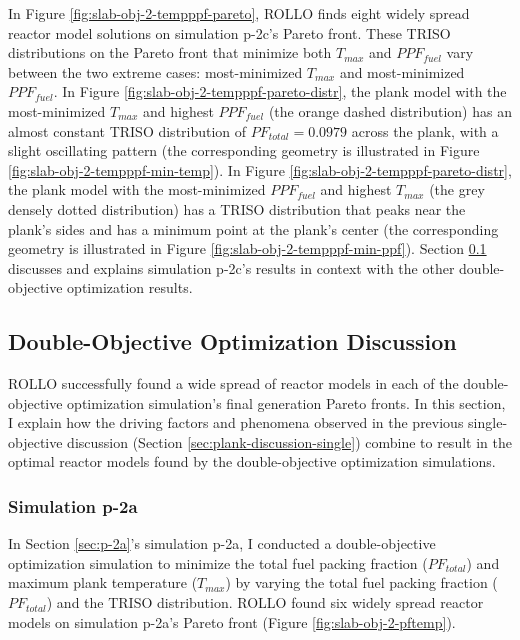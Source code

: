 In Figure \ref{fig:slab-obj-2-tempppf-pareto}, \gls{ROLLO} finds eight widely spread 
reactor model solutions on simulation p-2c's Pareto front. 
These \gls{TRISO} distributions on the Pareto front that minimize both $T_{max}$ 
and $PPF_{fuel}$ vary between the two extreme cases: 
most-minimized $T_{max}$ and most-minimized $PPF_{fuel}$.
In Figure \ref{fig:slab-obj-2-tempppf-pareto-distr}, the plank model with 
the most-minimized $T_{max}$ and highest $PPF_{fuel}$ (the orange dashed distribution) 
has an almost constant TRISO distribution of $PF_{total}=0.0979$ across the plank, 
with a slight oscillating pattern (the corresponding geometry is illustrated in Figure 
\ref{fig:slab-obj-2-tempppf-min-temp}).
In Figure \ref{fig:slab-obj-2-tempppf-pareto-distr}, the plank model with the
most-minimized $PPF_{fuel}$ and highest $T_{max}$ (the grey densely dotted 
distribution) has a TRISO distribution that peaks near the plank's sides and has 
a minimum point at the plank's center (the corresponding geometry is illustrated in Figure 
\ref{fig:slab-obj-2-tempppf-min-ppf}). 
Section \ref{sec:plank-discussion-two} discusses and explains simulation p-2c's results
in context with the other double-objective optimization results.

\subsection{Double-Objective Optimization Discussion}
\label{sec:plank-discussion-two}
\gls{ROLLO} successfully found a wide spread of reactor models in each of the 
double-objective optimization simulation's final generation Pareto fronts.
In this section, I explain how the driving factors and phenomena observed in 
the previous single-objective discussion (Section \ref{sec:plank-discussion-single}) 
combine to result in the optimal reactor models found by the double-objective optimization 
simulations. 

\subsubsection{Simulation p-2a}
In Section \ref{sec:p-2a}'s simulation p-2a, I conducted a double-objective 
optimization simulation to minimize the total fuel packing fraction ($PF_{total}$) and 
maximum plank temperature ($T_{max}$) by varying the total fuel 
packing fraction ($PF_{total}$) and the TRISO distribution. 
\gls{ROLLO} found six widely spread reactor models on simulation p-2a's Pareto 
front (Figure \ref{fig:slab-obj-2-pftemp}). 

